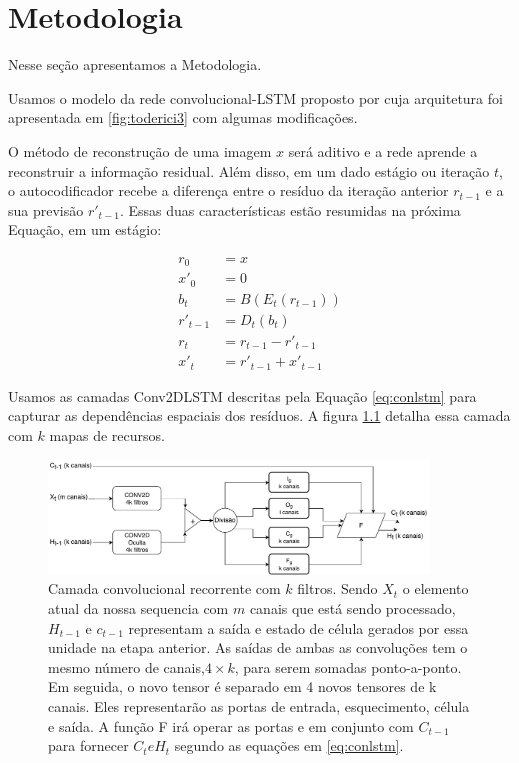 \chapter{Metodologia}
Nesse seção apresentamos a Metodologia.

Usamos o modelo da rede convolucional-LSTM proposto por \cite{FullResolution2017Toderici} cuja arquitetura foi apresentada em \ref{fig:toderici3} com algumas modificações. 

O método de reconstrução de uma imagem $x$ será aditivo e a rede aprende a reconstruir a informação residual. Além disso, em um dado estágio ou iteração $t$, o autocodificador recebe a diferença entre o resíduo da iteração anterior $r_{t-1}$ e a sua previsão $r'_{t-1}$. Essas duas características estão resumidas na próxima Equação, em um estágio:

\begin{equation}
\label{eq:model_1it}
\begin{aligned}
r_{0} &=x\\
x'_0  &=0 \\
b_{t} &= B(E_{t}(r_{t-1})) \\
r'_{t-1} &= D_{t}(b_{t}) \\
r_{t} &= r_{t-1}- r'_{t-1} \\
x'_t &= r'_{t-1} + x'_{t-1}  
\end{aligned}
\end{equation}




Usamos as camadas Conv2DLSTM descritas pela Equação \ref{eq:conlstm} para capturar as dependências espaciais dos resíduos. A figura \ref{fig:convlstm} detalha essa camada com $k$ mapas de recursos. 

\begin{figure}[ht]
	\centering
	\includegraphics[width=0.90\textwidth]{figuras/convlstm.pdf}
	\caption[Conv2DLSTM]{Camada convolucional recorrente com $k$ filtros. Sendo $X_t$ o elemento atual da nossa sequencia com $m$ canais que está sendo processado, $H_{t-1}$ e $c_{t-1}$ representam a saída e estado de célula gerados por essa unidade na etapa anterior. As saídas de ambas as convoluções tem o mesmo número de canais,$4\times k$, para serem somadas ponto-a-ponto. Em seguida, o novo tensor é separado em 4 novos tensores de k canais. Eles representarão as portas de entrada, esquecimento, célula e saída. A função F irá operar as portas e em conjunto com $C_{t-1}$ para fornecer $C_t e H_t$ segundo as equações em \ref{eq:conlstm}.}
	\label{fig:convlstm}
\end{figure}

